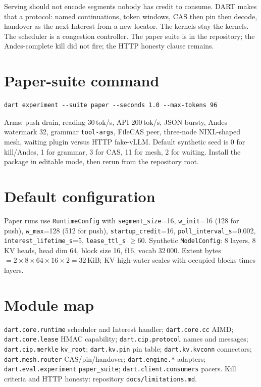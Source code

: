 \documentclass{article}
\theoremstyle{definition}
\newcommand{\kvroot}{\texttt{kv\_root}}
\begin{document}
Serving should not encode segments nobody has credit to consume.
DART makes that a protocol: named continuations, token windows, CAS then pin then decode, handover as the next Interest from a new locator.
The kernels stay the kernels.
The scheduler is a congestion controller.
The paper suite is in the repository; the Andes-complete kill did not fire; the HTTP honesty clause remains.

{\small


}

\appendix
\section{Paper-suite command}
\label{app:cmd}

\begin{verbatim}
dart experiment --suite paper --seconds 1.0 --max-tokens 96
\end{verbatim}

Arms: push drain, reading 30\,tok/s, API 200\,tok/s, JSON bursty, Andes watermark 32, grammar \texttt{tool-args}, FileCAS peer, three-node NIXL-shaped mesh, waiting plugin versus HTTP fake-vLLM.
Default synthetic seed is 0 for kill/Andes, 1 for grammar, 3 for CAS, 11 for mesh, 2 for waiting.
Install the package in editable mode, then rerun from the repository root.

\section{Default configuration}
\label{app:cfg}

Paper runs use \texttt{RuntimeConfig} with \texttt{segment\_size}{=}16, \texttt{w\_init}{=}16 (128 for push), \texttt{w\_max}{=}128 (512 for push), \texttt{startup\_credit}{=}16, \texttt{poll\_interval\_s}{=}0.002, \texttt{interest\_lifetime\_s}{=}5, \texttt{lease\_ttl\_s} $\ge 60$.
Synthetic \texttt{ModelConfig}: 8 layers, 8 KV heads, head dim 64, block size 16, f16, vocab 32\,000.
Extent bytes $= 2 \times 8 \times 64 \times 16 \times 2 = 32$\,KiB; KV high-water scales with occupied blocks times layers.

\section{Module map}
\label{app:mod}

\texttt{dart.core.runtime} scheduler and Interest handler;
\texttt{dart.core.cc} AIMD;
\texttt{dart.core.lease} HMAC capability;
\texttt{dart.cip.protocol} names and messages;
\texttt{dart.cip.merkle} \kvroot{};
\texttt{dart.kv.pin} pin table;
\texttt{dart.kv.kvconn} connectors;
\texttt{dart.mesh.router} CAS/pin/handover;
\texttt{dart.engine.*} adapters;
\texttt{dart.eval.experiment} \texttt{paper\_suite};
\texttt{dart.client.consumers} pacers.
Kill criteria and HTTP honesty: repository \texttt{docs/limitations.md}.
\end{document}
